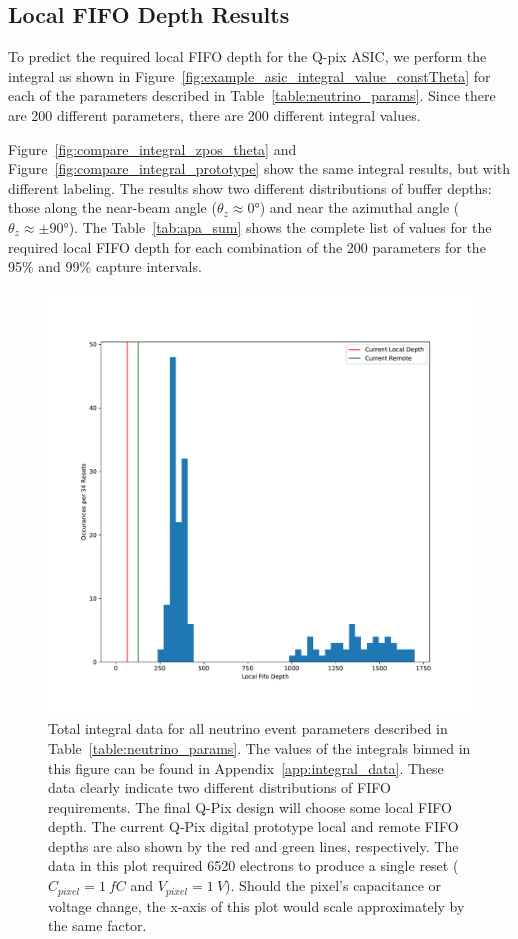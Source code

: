 \subsection{Local FIFO Depth Results}

To predict the required local FIFO depth for the Q-pix ASIC, we perform the integral as shown in Figure~\ref{fig:example_asic_integral_value_constTheta} for each of the parameters described in Table~\ref{table:neutrino_params}. 
Since there are 200 different parameters, there are 200 different integral values.

Figure~\ref{fig:compare_integral_zpos_theta} and Figure~\ref{fig:compare_integral_prototype} show the same integral results, but with different labeling.
The results show two different distributions of buffer depths: those along the near-beam angle ($\theta_{z} \approx 0$\unit{\degree}) and near the azimuthal angle ($\theta_{z} \approx \pm 90$\unit{\degree}). 
The Table~\ref{tab:apa_sum} shows the complete list of values for the required local FIFO depth for each combination of the 200 parameters for the 95\% and 99\% capture intervals.

\begin{figure}[]
\centering
\includegraphics[width=\textwidth]{images/df_nolabel_line.pdf}
\caption{Total integral data for all neutrino event parameters described in Table~\ref{table:neutrino_params}.
The values of the integrals binned in this figure can be found in Appendix~\ref{app:integral_data}.
These data clearly indicate two different distributions of FIFO requirements.
The final Q-Pix design will choose some local FIFO depth.
The current Q-Pix digital prototype local and remote FIFO depths are also shown by the red and green lines, respectively.
The data in this plot required 6520 electrons to produce a single reset ($C_{pixel} = 1~\unit{fC}$ and $V_{pixel} = 1~\unit{V}$).
Should the pixel's capacitance or voltage change, the x-axis of this plot would scale approximately by the same factor.
}
\end{figure}~\label{fig:compare_integral_prototype}

